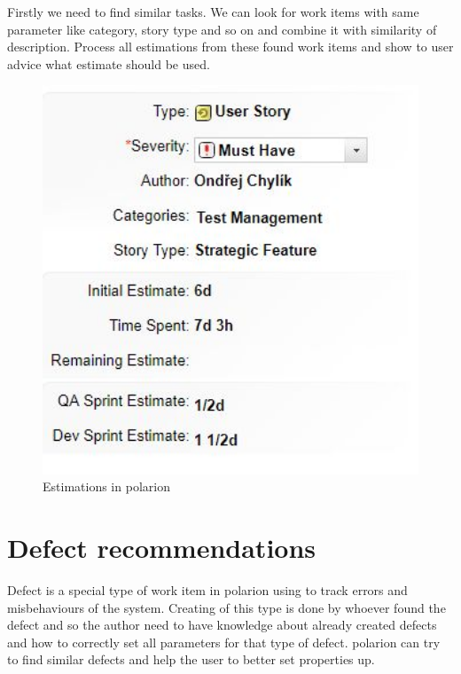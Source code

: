 \documentclass[thesis=M,english]{FITthesis}[2012/06/26]
\begin{document}
Firstly we need to find similar tasks. We can look for work items with same parameter like category, story type and so on and combine it with similarity of description. Process all estimations from these found work items and show to user advice what estimate should be used.

\begin{figure}[h!]\centering
	\includegraphics[width=1\textwidth]{pictures/polarion_estimation}
	\caption{Estimations in \acrshort{polarion}}\label{fig:polarion_estimation}
\end{figure}

\section{Defect recommendations} \label{sec:defect_recommendations}

Defect is a special type of work item in \acrshort{polarion} using to track errors and misbehaviours of the system. Creating of this type is done by whoever found the defect and so the author need to have knowledge about already created defects and how to correctly set all parameters for that type of defect. \acrshort{polarion} can try to find similar defects and help the user to better set properties up.\\
\end{document}
